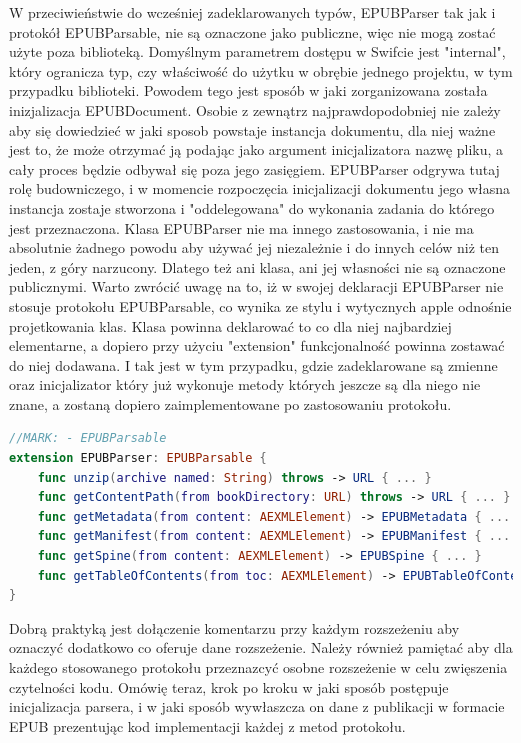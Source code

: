 W przeciwieństwie do wcześniej zadeklarowanych typów, EPUBParser tak jak i protokół EPUBParsable, nie są oznaczone jako publiczne, więc nie mogą zostać użyte poza biblioteką. Domyślnym parametrem dostępu w Swifcie jest "internal", który ogranicza typ, czy właściwość do użytku w obrębie jednego projektu, w tym przypadku biblioteki. Powodem tego jest sposób w jaki zorganizowana została inizjalizacja EPUBDocument. Osobie z zewnątrz najprawdopodobniej nie zależy aby się dowiedzieć w jaki sposob powstaje instancja dokumentu, dla niej ważne jest to, że może otrzymać ją podając jako argument inicjalizatora nazwę pliku, a cały proces będzie odbywał się poza jego zasięgiem. EPUBParser odgrywa tutaj rolę budowniczego, i w momencie rozpoczęcia inicjalizacji dokumentu jego własna instancja zostaje stworzona i "oddelegowana" do wykonania zadania do którego jest przeznaczona. Klasa EPUBParser nie ma innego zastosowania, i nie ma absolutnie żadnego powodu aby używać jej niezależnie i do innych celów niż ten jeden, z góry narzucony. Dlatego też ani klasa, ani jej własności nie są oznaczone publicznymi. Warto zwrócić uwagę na to, iż w swojej deklaracji EPUBParser nie stosuje protokołu EPUBParsable, co wynika ze stylu i wytycznych apple odnośnie projetkowania klas. Klasa powinna deklarować to co dla niej najbardziej elementarne, a dopiero przy użyciu "extension" funkcjonalność powinna zostawać do niej dodawana. I tak jest w tym przypadku, gdzie zadeklarowane są zmienne oraz inicjalizator który już wykonuje metody których jeszcze są dla niego nie znane, a zostaną dopiero zaimplementowane po zastosowaniu protokołu.

\begin{lstlisting}[firstnumber=30,caption={Klasa EPUBParser stosuje protokół EPUBParsable.}, language=swift]
//MARK: - EPUBParsable
extension EPUBParser: EPUBParsable {
    func unzip(archive named: String) throws -> URL { ... }
    func getContentPath(from bookDirectory: URL) throws -> URL { ... }
    func getMetadata(from content: AEXMLElement) -> EPUBMetadata { ... }
    func getManifest(from content: AEXMLElement) -> EPUBManifest { ... }
    func getSpine(from content: AEXMLElement) -> EPUBSpine { ... }
    func getTableOfContents(from toc: AEXMLElement) -> EPUBTableOfContents { ... }
}
\end{lstlisting}

Dobrą praktyką jest dołączenie komentarzu przy każdym rozszeżeniu aby oznaczyć dodatkowo co oferuje dane rozszeżenie. Należy również pamiętać aby dla każdego stosowanego protokołu przeznazcyć osobne rozszeżenie w celu zwięszenia czytelności kodu. Omówię teraz, krok po kroku w jaki sposób postępuje inicjalizacja parsera, i w jaki sposób wywłaszcza on dane z publikacji w formacie EPUB prezentując kod implementacji każdej z metod protokołu.

